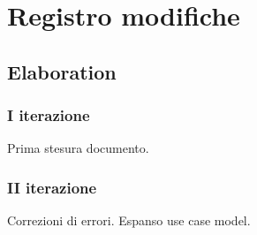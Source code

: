 \documentclass[10pt]{softeng} %
\begin{document}
\startofdocument{}











% 

\section{Registro modifiche}

\subsection{Elaboration}

\subsubsection{I iterazione}

Prima stesura documento.

\subsubsection{II iterazione}

Correzioni di errori.
Espanso use case model.


\printcustombib{}

\end{document}
